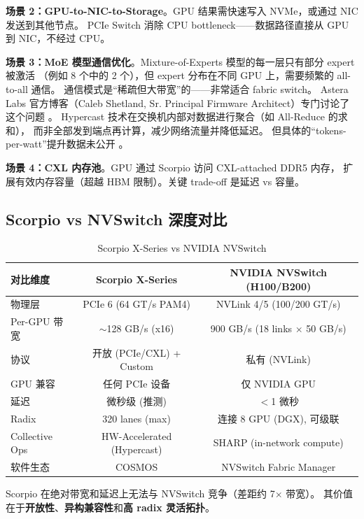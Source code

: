 \textbf{场景 2：GPU-to-NIC-to-Storage}。GPU 结果需快速写入 NVMe，或通过 NIC 发送到其他节点。
PCIe Switch 消除 CPU bottleneck——数据路径直接从 GPU 到 NIC，不经过 CPU。

\textbf{场景 3：MoE 模型通信优化}。Mixture-of-Experts 模型的每一层只有部分 expert 被激活
（例如 8 个中的 2 个），但 expert 分布在不同 GPU 上，需要频繁的 all-to-all 通信。
通信模式是``稀疏但大带宽''的——非常适合 fabric switch。
Astera Labs 官方博客（Caleb Shetland, Sr. Principal Firmware Architect）专门讨论了这个问题 。
Hypercast 技术在交换机内部对数据进行聚合（如 All-Reduce 的求和），
而非全部发到端点再计算，减少网络流量并降低延迟。
但具体的``tokens-per-watt''提升数据未公开 \unverified{}。

\textbf{场景 4：CXL 内存池}。GPU 通过 Scorpio 访问 CXL-attached DDR5 内存，
扩展有效内存容量（超越 HBM 限制）。关键 trade-off 是延迟 vs 容量。

\subsection{Scorpio vs NVSwitch 深度对比}

\begin{table}[htb]
    \centering
    \caption{Scorpio X-Series vs NVIDIA NVSwitch}
    \label{tab:scorpio-vs-nvswitch}
    \begin{tabular}{lcc}
        \toprule
        \textbf{对比维度} & \textbf{Scorpio X-Series} & \textbf{NVIDIA NVSwitch (H100/B200)} \\
        \midrule
        物理层 & PCIe 6 (64 GT/s PAM4) & NVLink 4/5 (100/200 GT/s) \\
        Per-GPU 带宽 & $\sim$128 GB/s (x16) & 900 GB/s (18 links $\times$ 50 GB/s) \\
        协议 & 开放 (PCIe/CXL) + Custom & 私有 (NVLink) \\
        GPU 兼容 & 任何 PCIe 设备 & 仅 NVIDIA GPU \\
        延迟 & 微秒级 (推测) & $<$1 微秒 \\
        Radix & 320 lanes (max) & 连接 8 GPU (DGX), 可级联 \\
        Collective Ops & HW-Accelerated (Hypercast) & SHARP (in-network compute) \\
        软件生态 & COSMOS & NVSwitch Fabric Manager \\
        \bottomrule
    \end{tabular}
\end{table}

Scorpio 在绝对带宽和延迟上无法与 NVSwitch 竞争（差距约 7$\times$ 带宽）。
其价值在于\textbf{开放性}、\textbf{异构兼容性}和\textbf{高 radix 灵活拓扑}。

